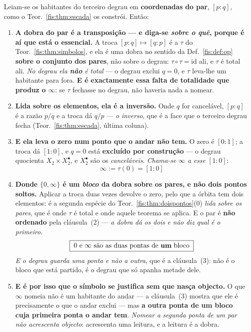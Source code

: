 \documentclass[livro.tex]{subfiles}
\begin{document}
\begin{teorema}\label{fis:thm:zeroinf}
Leiam-se os habitantes do terceiro degrau em \textbf{coordenadas do par},
$[p:q]$, como o Teor.~\ref{fis:thm:escada} os constrói. Então:
\begin{enumerate}\itemsep3pt
\item[(1)] \textbf{A dobra do par é a transposição --- e diga-se \emph{sobre o
quê}, porque é aí que está o essencial.} A troca $[p:q]\mapsto[q:p]$ é a $\tau$ do
Teor.~\ref{fis:thm:simbolos}, e ela é uma dobra no sentido da
Def.~\ref{fis:def:op} \textbf{sobre o conjunto dos pares}, não sobre o degrau:
$\tau\circ\tau=\mathrm{id}$ ali, e $\tau$ é total ali. \emph{No degrau ela
\textbf{não} é total} --- o degrau exclui $q=0$, e $\tau$ leva-lhe um habitante
para fora. \textbf{E é exactamente essa falta de totalidade que produz o
$\infty$}: se $\tau$ fechasse no degrau, não haveria nada a nomear.
\item[(2)] \textbf{Lida sobre os elementos, ela é a inversão.} Onde $q$ for
cancelável, $[p:q]$ é a razão $p/q$ e a troca dá $q/p$ --- \emph{o inverso}, que
é a face que o terceiro degrau fecha (Teor.~\ref{fis:thm:escada}, última coluna).
\item[(3)] \textbf{E ela leva o zero num ponto que o andar não tem.} O zero é
$[0:1]$; a troca dá $[1:0]$, e $q=0$ está \textbf{excluído por construção} --- o
degrau quocienta $X_2\times X_2^{\bullet}$, e $X_2^{\bullet}$ são os
\emph{canceláveis}. \emph{Chama-se $\infty$ a esse $[1:0]$}:
\[
\boxed{\;\infty:=\tau(0)=[1:0]\;}
\]
\item[(4)] \textbf{Donde $\{0,\infty\}$ é um \emph{bloco} da dobra sobre os pares,
e não dois pontos soltos.} Aplicar a troca duas vezes devolve o zero, pelo que a
órbita tem dois elementos: é a segunda espécie do
Teor.~\ref{fis:thm:doispontos}(0) \emph{lida sobre os pares}, que é onde $\tau$ é
total e onde aquele teorema se aplica. E o par é \textbf{não ordenado} pela
cláusula~(2) --- \emph{a dobra dá os dois e não diz qual é o primeiro}.
\[
\boxed{\;0\ \text{e}\ \infty\ \text{são as duas pontas de \textbf{um} bloco}\;}
\]
\emph{E o degrau guarda uma ponta e não a outra}, que é a cláusula~(3): não é o
bloco que está partido, é o degrau que só apanha metade dele.
\item[(5)] \textbf{E é por isso que o símbolo se justifica sem que nasça
objecto.} O que $\infty$ nomeia não é um habitante do andar --- a
cláusula~(3) mostra que ele é precisamente o que o andar exclui --- mas
\textbf{a outra ponta de um bloco cuja primeira ponta o andar tem}. \emph{Nomear
a segunda ponta de um par não acrescenta objecto}: acrescenta uma leitura, e a
leitura é a dobra.
\end{enumerate}
\end{teorema}
\end{document}
